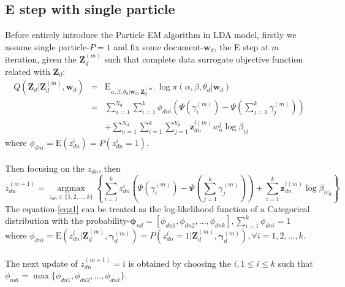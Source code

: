 \documentclass[a4paper]{article}
\newcommand{\be}{\begin{equation}}
\newcommand{\ee}{\end{equation}}
\newcommand{\bs}{\boldsymbol}
\newcommand{\ba}{\begin{array}}
\newcommand{\ea}{\end{array}}
\newcommand{\E}{\mathrm{E}}
\newcommand{\Sum}{\displaystyle\sum}
\begin{document}
\subsection{E step with single particle}
Before entirely introduce the Particle EM algorithm in LDA model, firstly we assume single particle-$P=1$ and fix some document-$\bs{w}_d$, the E step at $m$ iteration, given the $\bs{Z}_d^{(m)}$ such that complete data surrogate objective function related with $\bs{Z}_d$:\\
\be\label{elbo4}
\ba{rcl}
Q(\bs{Z}_d|\bs{Z}_d^{(m)},\bs{w}_d)&=&\E_{\alpha,\beta,\theta_d|\bs{w}_d,\bs{Z}_d^{(m)}}\log \pi(\alpha,\beta,\theta_d|\bs{w}_d)\\
&=&\Sum_{n=1}^{N_d}\Sum_{i=1}^{k}\phi_{dni}(\Psi(\gamma_i^{(m)})-\Psi(\sum_{j=1}^{k}\gamma_j^{(m)}))\\
&&+\Sum_{n=1}^{N_d}\Sum_{i=1}^{k}\Sum_{j=1}^{V_d}\bs{z}_{dn}^{i(m)}w_n^j\log\beta_{ij}
\ea
\ee
where $\phi_{dni}=\E(z_{dn}^{i})=P(z_{dn}^{i}=1)$.\\
\\
Then focusing on the $z_{dn}$, then
\be\label{eqz1}
z_{dn}^{(m+1)}=\underset{z_{dn}\in\{1,2,\ldots,k\}}{\operatorname{argmax}}\left\{\Sum_{i=1}^{k}z_{dn}^{i}(\Psi(\gamma_i^{(m)})-\Psi(\sum_{j=1}^{k}\gamma_j^{(m)}))+\Sum_{i=1}^{k}\bs{z}_{dn}^{i(m)}\log\beta_{iv_d}
	\right\}
\ee
The equation-\ref{eqz1} can be treated as the log-likelihood function of a Categorical distribution with the probability-$\bs{\phi}_{nd}=[\phi_{dn1},\phi_{dn2},\ldots,\phi_{dnk}],\sum_{i=1}^{k}\phi_{dni}=1$ where $\phi_{dni}=\E(z_{dn}^{i}|\bs{Z}_d^{(m)},\bs{\gamma}_d^{(m)})=P(z_{dn}^{i}=1|\bs{Z}_d^{(m)},\bs{\gamma}_d^{(m)}),\forall i=1,2,\ldots,k$.\\
\\

The next update of $z_{dn}^{(m+1)}=i$ is obtained by  choosing the $i,1\le i\le k$ such that $\phi_{ndi}=\max\{\phi_{dn1},\phi_{dn2},\ldots,\phi_{dnk}\}$.
\end{document}
